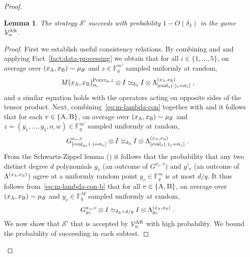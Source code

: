 \documentclass[11pt]{article}
\newtheorem{lemma}[theorem]{Lemma}
\theoremstyle{definition}
\newcommand{\F}{\ensuremath{\mathbb{F}}}
\newcommand{\ot}{\otimes}
\newcommand{\sampler}{\mathcal{S}}
\newcommand{\verifier}{\mathcal{V}}
\newcommand{\strategy}{\mathscr{S}}
\newcommand{\gamestyle}[1]{\ensuremath{\textsc{#1}}\xspace}
\newcommand{\ar}{\gamestyle{AR}}
\newcommand{\labelstyle}[1]{\ensuremath{\textsc{#1}}\xspace}
\newcommand{\alice}{\labelstyle{A}}
\newcommand{\bob}{\labelstyle{B}}
\newcommand{\typestyle}[1]{\ensuremath{\textsc{#1}}\xspace}
\newcommand{\Point}{\typestyle{Point}}
\newcommand{\eval}{\mathrm{eval}}
\begin{document}
\begin{proof}
\begin{lemma}\label{lem:ar-ar}
	The strategy $\strategy'$ succeeds with probability $1-O(\delta_3)$ in the
  game $\verifier^\ar_n$.
\end{lemma}

\begin{proof}
  First we establish useful consistency relations.
  By combining  and  and applying
  Fact~\ref{fact:data-processing} we obtain that for all $i\in \{1,\ldots,5\}$,
  on average over $({x}_\alice, {x}_\bob) \sim \mu_{\sampler}$ and $z\in
  \F_q^{m'}$ sampled uniformly at random,
  \begin{equation}
    \label{eq:m-lambda-con}
    M({x}_\alice, {x}_\bob)^{\Point_6, z}_{\alpha_i} \ot I
    \simeq_{\delta_3} I \ot  \Lambda^{({x}_\alice, {x}_\bob)}_{[\eval_z(\cdot)_i =
      \alpha_i]}\;,
  \end{equation}
	and a similar equation holds with the operators acting on opposite sides of
  the tensor product.
  Next, combining~\eqref{eq:m-lambda-con} together with
   and  it follows that for
  each $v \in \{\alice,\bob\}$, on average over $({x}_\alice, {x}_\bob) \sim
  \mu_{\sampler}$ and $z=(y_1,\ldots,y_5,o,w) \in \F_q^{m'}$ sampled uniformly
  at random,
  \begin{equation}\label{eq:m-lambda-con-b}
    G^{{x}_v, v}_{[\eval_{y_v}(\cdot) = \alpha_v]} \ot I \simeq_{\delta_3} I \ot
    \Lambda^{({x}_\alice, {x}_\bob)}_{[\eval_z(\cdot)_v = \alpha_v]}\;.
  \end{equation}
  From the Schwartz-Zippel lemma () it follows that
  the probability that any two distinct degree $d$ polynomials $g_v$ (an outcome
  of $G^{{x}_v, v}$) and $g'_v$ (an outcome of $\Lambda^{({x}_\alice,
    {x}_\bob)}$) agree at a uniformly random point $y_v\in \F_q^m$ is at most
  $d/q$.
  It thus follows from~\eqref{eq:m-lambda-con-b} that for all
  $v\in\{\alice,\bob\}$, on average over $({x}_\alice, {x}_\bob) \sim
  \mu_{\sampler}$ and $y_v \in\F_q^M$ sampled uniformly at random,
  \begin{equation}
    \label{eq:ld-strat-con-def}
    G^{{x}_v, v}_{g_v} \ot I \simeq_{\delta_3+d/q} I \ot \Lambda^{({x}_\alice,
      x_\bob)}_{g_v}\;.
  \end{equation}
  We now show that $\strategy'$ that is accepted by $\verifier_n^\ar$ with high
  probability.
  We bound the probability of succeeding in each subtest.


\end{proof}
\end{proof}
\end{document}
